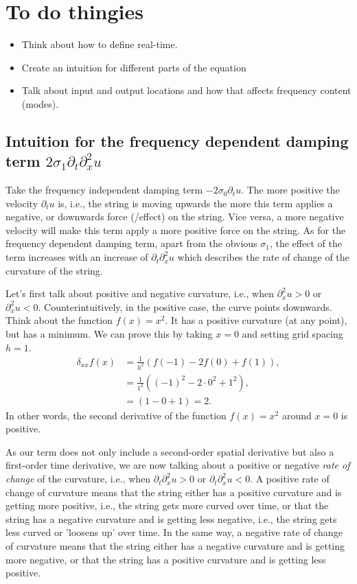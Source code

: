 \section{To do thingies}\label{sec:ch2label}
\begin{itemize}
  \item Think about how to define real-time.
  \item Create an intuition for different parts of the equation
  \item Talk about input and output locations and how that affects frequency content (modes).
\end{itemize}

\subsection{Intuition for the frequency dependent damping term $2\sigma_1\partial_t\partial_x^2u$}
Take the frequency independent damping term $-2\sigma_0\partial_tu$. The more positive the velocity $\partial_tu$ is, i.e., the string is moving upwards the more this term applies a negative, or downwards force (/effect) on the string. Vice versa, a more negative velocity will make this term apply a more positive force on the string. As for the frequency dependent damping term, apart from the obvious $\sigma_1$, the effect of the term increases with an increase of $\partial_t\partial_x^2u$ which describes the rate of change of the curvature of the string.

Let's first talk about positive and negative curvature, i.e., when $\partial_x^2u > 0$ or $\partial_x^2u < 0$. Counterintuitively, in the positive case, the curve points downwards. Think about the function $f(x) = x^2$. It has a positive curvature (at any point), but has a minimum. We can prove this by taking $x=0$ and setting grid spacing $h=1$.
\begin{equation}
  \begin{aligned}
  \delta_{xx}f(x) &= \frac{1}{h^2} \left(f(-1)-2f(0)+f(1)\right), \\
  &= \frac{1}{1^2} \left((-1)^2-2\cdot0^2+1^2\right),\\
  &= \left(1-0+1\right) = 2.
  \end{aligned}
\end{equation}
In other words, the second derivative of the function $f(x)=x^2$ around $x=0$ is positive.

As our term does not only include a second-order spatial derivative but also a first-order time derivative, we are now talking about a positive or negative \textit{rate of change} of the curvature, i.e., when $\partial_t\partial_x^2u>0$ or $\partial_t\partial_x^2u<0$. A positive rate of change of curvature means that the string either has a positive curvature and is getting more positive, i.e., the string gets more curved over time, or that the string has a negative curvature and is getting less negative, i.e., the string gets less curved or 'loosens up' over time.  In the same way, a negative rate of change of curvature means that the string either has a negative curvature and is getting more negative, or that the string has a positive curvature and is getting less positive. 


